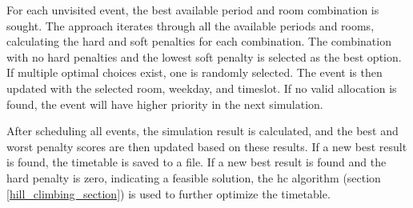 For each unvisited event, the best available period and room combination is sought. The approach iterates through all the available periods and rooms, calculating the hard and soft penalties for each combination. The combination with no hard penalties and the lowest soft penalty is selected as the best option. If multiple optimal choices exist, one is randomly selected. The event is then updated with the selected room, weekday, and timeslot. If no valid allocation is found, the event will have higher priority in the next simulation.

After scheduling all events, the simulation result is calculated, and the best and worst penalty scores are then updated based on these results. If a new best result is found, the timetable is saved to a file. If a new best result is found and the hard penalty is zero, indicating a feasible solution, the \ac{hc} algorithm (section \ref{hill_climbing_section}) is used to further optimize the timetable.


